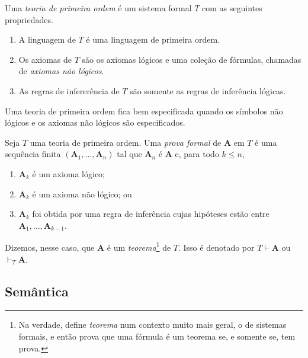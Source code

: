 \begin{definition}
    Uma \emph{teoria de primeira ordem} é um sistema formal $T$ com as seguintes propriedades.
        \begin{enumerate}[label=\roman*.]
            \item A linguagem de $T$ é uma linguagem de primeira ordem.
            \item Os axiomas de $T$ são os axiomas lógicos e uma coleção de fórmulas, chamadas de \emph{axiomas não lógicos}.
            \item As regras de infererência de $T$ são somente as regras de inferência lógicas.
        \end{enumerate}
    Uma teoria de primeira ordem fica bem especificada quando os símbolos não lógicos e os axiomas não lógicos são especificados.
\end{definition}

\begin{definition}
    Seja $T$ uma teoria de primeira ordem. Uma \emph{prova formal} de $\mathbf{A}$ em $T$ é uma sequência finita $(\mathbf{A}_1, \ldots, \mathbf{A}_n)$ tal que $\mathbf{A}_n$ é $\mathbf{A}$ e, para todo $k \leq n$,
        \begin{enumerate}[label=\roman*.]
            \item $\mathbf{A}_k$ é um axioma lógico;
            \item $\mathbf{A}_k$ é um axioma não lógico; ou
            \item $\mathbf{A}_k$ foi obtida por uma regra de inferência cujas hipóteses estão entre $\mathbf{A}_1, \ldots, \mathbf{A}_{k-1}$.
        \end{enumerate}
    Dizemos, nesse caso, que $\mathbf{A}$ é um \emph{teorema}\footnote{Na verdade, \cite{shoenfield1967} define \emph{teorema} num contexto muito mais geral, o de sistemas formais, e então prova que uma fórmula é um teorema se, e somente se, tem prova.} de $T$. Isso é denotado por $T \vdash \mathbf{A}$ ou $\vdash_T \mathbf{A}$.
\end{definition}

\subsection{Semântica}

